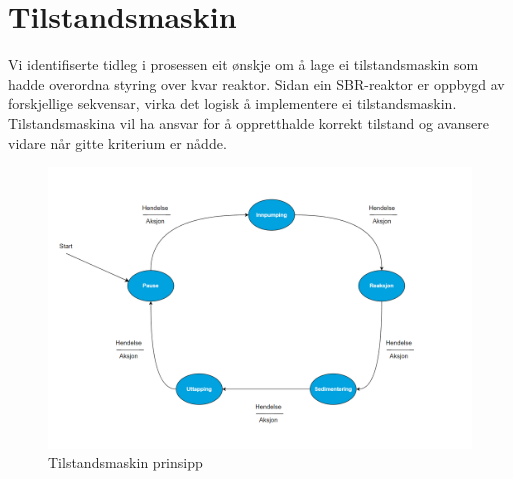 \section{Tilstandsmaskin}
\thispagestyle{fancy}

Vi identifiserte tidleg i prosessen eit ønskje om å lage ei tilstandsmaskin som hadde overordna styring over kvar reaktor. 
Sidan ein \gls{SBR}-reaktor er oppbygd av forskjellige sekvensar, virka det logisk å implementere ei tilstandsmaskin.
Tilstandsmaskina vil ha ansvar for å oppretthalde korrekt tilstand og avansere vidare når gitte kriterium er nådde.

\begin{figure}[htbp]
    \centering
    \includegraphics[width=1\textwidth]{Figurar/Tom tilstandsmaskin.png}
    \caption{Tilstandsmaskin prinsipp}\label{fig:Tilstandsmaskin prinsipp}    
\end{figure}

\newpage

